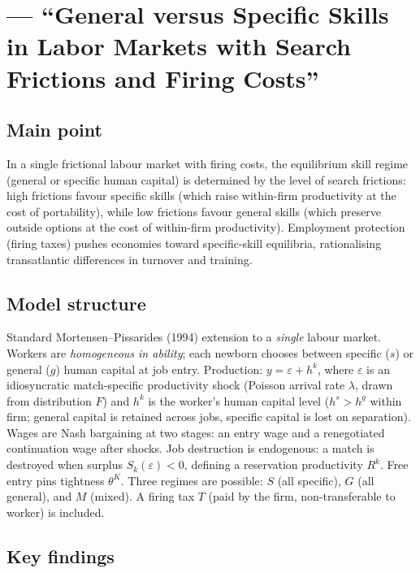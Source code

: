 \documentclass[12pt]{article}
\begin{document}
\section{\citet{wasmer2006} --- ``General versus Specific Skills in Labor Markets with Search Frictions and Firing Costs''}

\subsection*{Main point}

In a single frictional labour market with firing costs, the equilibrium skill regime (general or specific human capital) is determined by the level of search frictions: high frictions favour specific skills (which raise within-firm productivity at the cost of portability), while low frictions favour general skills (which preserve outside options at the cost of within-firm productivity). Employment protection (firing taxes) pushes economies toward specific-skill equilibria, rationalising transatlantic differences in turnover and training.

\subsection*{Model structure}

Standard Mortensen--Pissarides (1994) extension to a \emph{single} labour market. Workers are \emph{homogeneous in ability}; each newborn chooses between specific ($s$) or general ($g$) human capital at job entry. Production: $y = \varepsilon + h^k$, where $\varepsilon$ is an idiosyncratic match-specific productivity shock (Poisson arrival rate $\lambda$, drawn from distribution $F$) and $h^k$ is the worker's human capital level ($h^s > h^g$ within firm; general capital is retained across jobs, specific capital is lost on separation). Wages are Nash bargaining at two stages: an entry wage and a renegotiated continuation wage after shocks. Job destruction is endogenous: a match is destroyed when surplus $S_k(\varepsilon) < 0$, defining a reservation productivity $R^k$. Free entry pins tightness $\theta^K$. Three regimes are possible: $S$ (all specific), $G$ (all general), and $M$ (mixed). A firing tax $T$ (paid by the firm, non-transferable to worker) is included.

\subsection*{Key findings}
\end{document}
